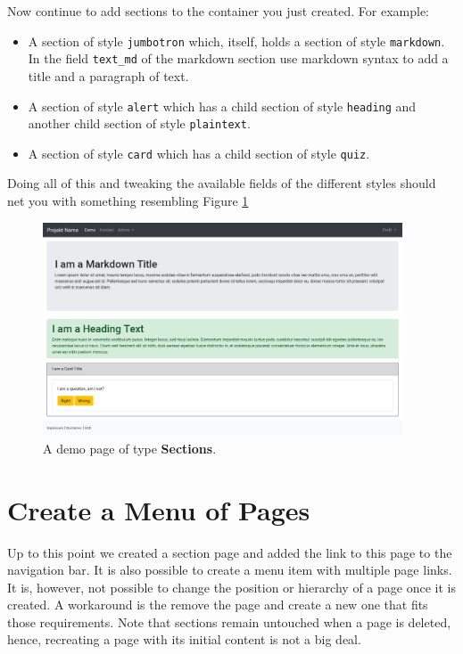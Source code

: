 \documentclass[a4paper,oneside]{book}
\begin{document}
Now continue to add sections to the container you just created. For example:
\begin{itemize}
    \item A section of style \texttt{jumbotron} which, itself, holds a section of style \texttt{markdown}.
        In the field \texttt{text\_md} of the markdown section use markdown syntax to add a title and a paragraph of text.
    \item A section of style \texttt{alert} which has a child section of style \texttt{heading} and another child section of style \texttt{plaintext}.
    \item A section of style \texttt{card} which has a child section of style \texttt{quiz}.
\end{itemize}

Doing all of this and tweaking the available fields of the different styles should net you with something resembling Figure \ref{fig.demo}

\begin{figure}[ht]
    \centering
    \includegraphics[width=0.95\textwidth]{demo.png}
    \caption{A demo page of type \textbf{Sections}.}
    \label{fig.demo}
\end{figure}

\section{Create a Menu of Pages}
Up to this point we created a section page and added the link to this page to the navigation bar.
It is also possible to create a menu item with multiple page links.
It is, however, not possible to change the position or hierarchy of a page once it is created.
A workaround is the remove the page and create a new one that fits those requirements.
Note that sections remain untouched when a page is deleted, hence, recreating a page with its initial content is not a big deal.
\end{document}
